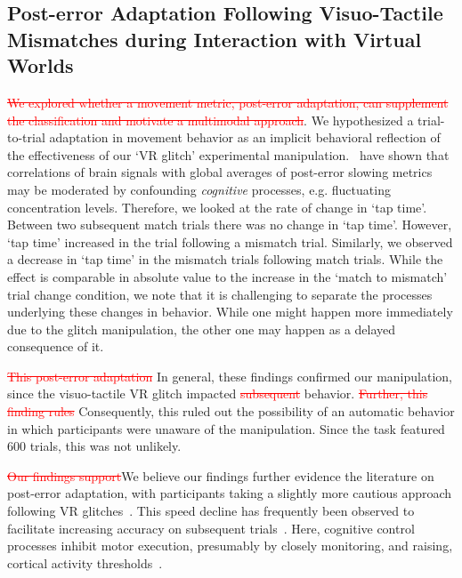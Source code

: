 \subsection{Post-error Adaptation Following Visuo-Tactile Mismatches during Interaction with Virtual Worlds}

\textcolor{red}{\st{We explored whether a movement metric, post-error adaptation, can supplement the classification and motivate a multimodal approach}}. We hypothesized a trial-to-trial adaptation in movement behavior as an implicit behavioral reflection of the effectiveness of our `VR glitch' experimental manipulation.~\cite{Dutilh2012-ps} have shown that correlations of brain signals with global averages of post-error slowing metrics may be moderated by confounding \textit{cognitive} processes, e.g. fluctuating concentration levels. Therefore, we looked at the rate of change in `tap time'. Between two subsequent match trials there was no change in `tap time'. However, `tap time' increased in the trial following a mismatch trial. \textcolor{n}{Similarly, we observed a decrease in `tap time' in the mismatch trials following match trials. While the effect is comparable in absolute value to the increase in the `match to mismatch' trial change condition, we note that it is challenging to separate the processes underlying these changes in behavior. While one might happen more immediately due to the glitch manipulation, the other one may happen as a delayed consequence of it.}

\textcolor{red}{\st{This post-error adaptation}} \textcolor{n}{In general, these findings} confirmed our manipulation, since the visuo-tactile VR glitch impacted \textcolor{red}{\st{subsequent}} behavior. \textcolor{red}{\st{Further, this finding rules}} \textcolor{n}{Consequently, this ruled} out the possibility of an automatic behavior in which participants were unaware of the manipulation. Since the task featured 600 trials, this was not unlikely. 

\textcolor{red}{\st{Our findings support}}\textcolor{n}{We believe our findings further evidence} the literature on post-error adaptation, with participants taking a slightly more cautious approach following VR glitches~\cite{Rabbitt1977-yg}. This speed decline has frequently been observed to facilitate increasing accuracy on subsequent trials~\cite{Ridderinkhof2004-rz}. Here, cognitive control processes inhibit motor execution, presumably by closely monitoring, and raising, cortical activity thresholds~\cite{Botvinick2001-bs}.

